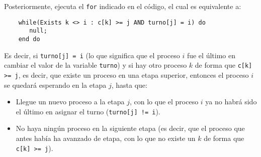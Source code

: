 Posteriormente, ejecuta el \verb|for| indicado en el código, el cual es equivalente a:
\begin{verbatim}
    while(Exists k <> i : c[k] >= j AND turno[j] = i) do 
       null;
    end do
\end{verbatim}
Es decir, si \verb|turno[j] = i| (lo que significa que el proceso $i$ fue el último en cambiar el valor de la variable \verb|turno|) y si hay otro proceso $k$ de forma que \verb|c[k] >= j|, es decir, que existe un proceso en una etapa superior, entonces el proceso $i$ se quedará esperando en la etapa $j$, hasta que:
\begin{itemize}
    \item Llegue un nuevo proceso a la etapa $j$, con lo que el proceso $i$ ya no habrá sido el último en asignar el turno (\verb|turno[j] != i|).
    \item No haya ningún proceso en la siguiente etapa (es decir, que el proceso que antes había ha avanzado de etapa, con lo que no existe un $k$ de forma que \verb|c[k] >= j|).
\end{itemize}

